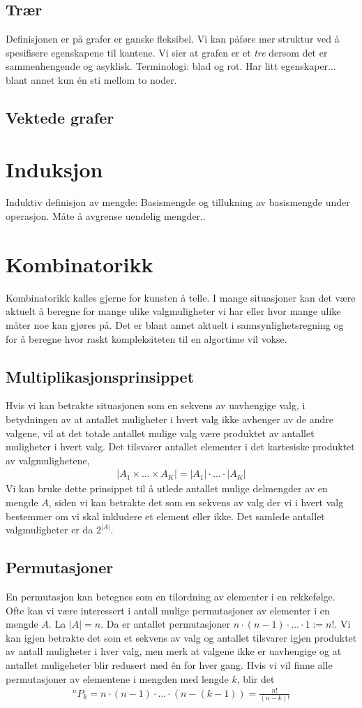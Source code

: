 \subsection{Trær}
Definisjonen er på grafer er ganske fleksibel. Vi kan påføre mer struktur ved å spesifisere egenskapene til kantene. Vi sier at grafen er et \textit{tre} dersom det er sammenhengende og asyklisk. Terminologi: blad og rot. Har litt egenskaper... blant annet kun én sti mellom to noder.
\subsection{Vektede grafer}
\section{Induksjon}
Induktiv definisjon av mengde: Basismengde og tillukning av basismengde under operasjon. Måte å avgrense uendelig mengder..
\section{Kombinatorikk}
Kombinatorikk kalles gjerne for kunsten å telle. I mange situasjoner kan det være aktuelt å beregne for mange ulike valgmuligheter vi har eller hvor mange ulike måter noe kan gjøres på. Det er blant annet aktuelt i sannsynlighetsregning og for å beregne hvor raskt kompleksiteten til en algortime vil vokse. 
\subsection{Multiplikasjonsprinsippet}
Hvis vi kan betrakte situasjonen som en sekvens av uavhengige valg, i betydningen av at antallet muligheter i hvert valg ikke avhenger av de andre valgene, vil at det totale antallet mulige valg være produktet av antallet muligheter i hvert valg. Det tilsvarer antallet elementer i det kartesiske produktet av valgmulighetene,
\begin{align}
|A_1 \times \ldots \times A_K| = |A_1|\cdot \ldots \cdot |A_K|
\end{align}
Vi kan bruke dette prinsippet til å utlede antallet mulige delmengder av en mengde $A$, siden vi kan betrakte det som en sekvens av valg der vi i hvert valg bestemmer om vi skal inkludere et element eller ikke. Det samlede antallet valgmuligheter er da $2^{|A|}$.
\subsection{Permutasjoner}
En permutasjon kan betegnes som en tilordning av elementer i en rekkefølge. Ofte kan vi være interessert i antall mulige permutasjoner av elementer i en mengde $A$. La $|A|=n$. Da er antallet permutasjoner $n\cdot(n-1)\cdot\ldots\cdot 1 := n!$. Vi kan igjen betrakte det som et sekvens av valg og antallet tilsvarer igjen produktet av antall muligheter i hver valg, men merk at valgene ikke er uavhengige og at antallet muligeheter blir redusert med én for hver gang. Hvis vi vil finne alle permutasjoner av elementene i mengden med lengde $k$, blir det
\begin{align}
^nP_k = n\cdot(n-1)\cdot\ldots\cdot(n-(k-1)) = \frac{n!}{(n-k)!}
\end{align}
